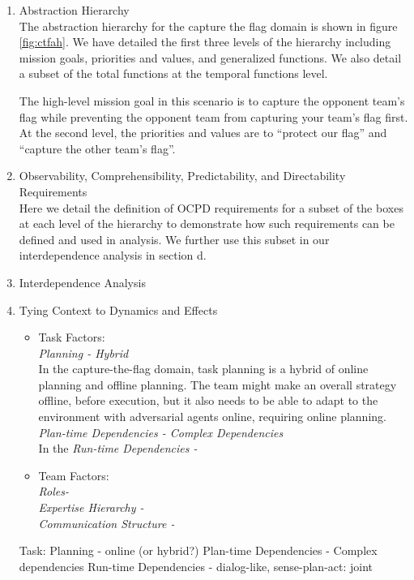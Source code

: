 \documentclass[letterpaper, 10 pt, conference]{ieeeconf}  %
\theoremstyle{definition}
\begin{document}
\begin{enumerate}
\begin{enumerate}
    \item Abstraction Hierarchy
    \\The abstraction hierarchy for the capture the flag domain is shown in figure \ref{fig:ctfah}. We have detailed the first three levels of the hierarchy including mission goals, priorities and values, and generalized functions. We also detail a subset of the total functions at the temporal functions level. %
    
    The high-level mission goal in this scenario is to capture the opponent team's flag while preventing the opponent team from capturing your team's flag first. At the second level, the priorities and values are to ``protect our flag'' and ``capture the other team's flag''.
    

    \item Observability, Comprehensibility, Predictability, and Directability Requirements
    \\Here we detail the definition of OCPD requirements for a subset of the boxes at each level of the hierarchy to demonstrate how such requirements can be defined and used in analysis. We further use this subset in our interdependence analysis in section d.
    
    \item Interdependence Analysis
    \item Tying Context to Dynamics and Effects
    \begin{itemize}
        \item Task Factors: \\
        \textit{Planning - Hybrid}\\
        In the capture-the-flag domain, task planning is a hybrid of online planning and offline planning. The team might make an overall strategy offline, before execution, but it also needs to be able to adapt to the environment with adversarial agents online, requiring online planning. \\
        \textit{Plan-time Dependencies - Complex Dependencies}\\
        In the 
        \textit{Run-time Dependencies - }\\
        \item Team Factors: \\
        \textit{Roles- }\\
        \textit{Expertise Hierarchy - }\\
        \textit{Communication Structure - }\\
    \end{itemize}
    Task:
		Planning - online (or hybrid?)
		Plan-time Dependencies - Complex dependencies
		Run-time Dependencies - dialog-like, sense-plan-act: joint


\end{enumerate}
\end{enumerate}
\end{document}
